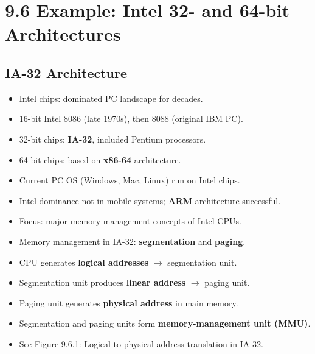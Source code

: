 \section*{9.6 Example: Intel 32- and 64-bit Architectures}

\subsection*{IA-32 Architecture}
\begin{itemize}
    \item Intel chips: dominated PC landscape for decades.
    \item 16-bit Intel 8086 (late 1970s), then 8088 (original IBM PC).
    \item 32-bit chips: \textbf{IA-32}, included Pentium processors.
    \item 64-bit chips: based on \textbf{x86-64} architecture.
    \item Current PC OS (Windows, Mac, Linux) run on Intel chips.
    \item Intel dominance not in mobile systems; \textbf{ARM} architecture successful.
    \item Focus: major memory-management concepts of Intel CPUs.
    \item Memory management in IA-32: \textbf{segmentation} and \textbf{paging}.
    \item CPU generates \textbf{logical addresses} $\rightarrow$ segmentation unit.
    \item Segmentation unit produces \textbf{linear address} $\rightarrow$ paging unit.
    \item Paging unit generates \textbf{physical address} in main memory.
    \item Segmentation and paging units form \textbf{memory-management unit (MMU)}.
    \item See Figure 9.6.1: Logical to physical address translation in IA-32.
\end{itemize}

